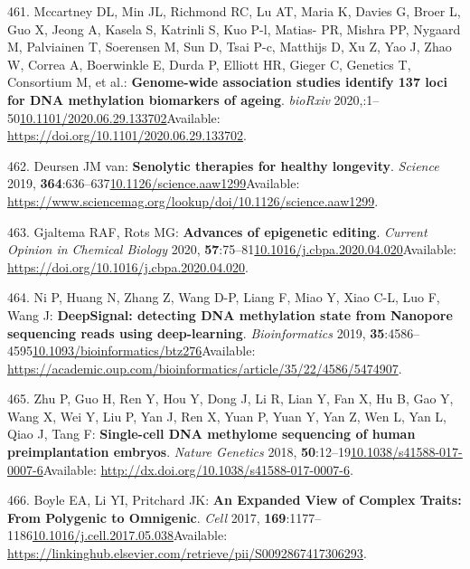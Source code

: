 \documentclass[
]{book}
\begin{document}
\leavevmode\hypertarget{ref-Mccartney2020}{}%
461. Mccartney DL, Min JL, Richmond RC, Lu AT, Maria K, Davies G, Broer L, Guo X, Jeong A, Kasela S, Katrinli S, Kuo P-l, Matias- PR, Mishra PP, Nygaard M, Palviainen T, Soerensen M, Sun D, Tsai P-c, Matthijs D, Xu Z, Yao J, Zhao W, Correa A, Boerwinkle E, Durda P, Elliott HR, Gieger C, Genetics T, Consortium M, et al.: \textbf{Genome-wide association studies identify 137 loci for DNA methylation biomarkers of ageing}. \emph{bioRxiv} 2020,:1--50\href{https://doi.org/10.1101/2020.06.29.133702}{10.1101/2020.06.29.133702}Available: \url{https://doi.org/10.1101/2020.06.29.133702}.

\leavevmode\hypertarget{ref-VanDeursen2019}{}%
462. Deursen JM van: \textbf{Senolytic therapies for healthy longevity}. \emph{Science} 2019, \textbf{364}:636--637\href{https://doi.org/10.1126/science.aaw1299}{10.1126/science.aaw1299}Available: \url{https://www.sciencemag.org/lookup/doi/10.1126/science.aaw1299}.

\leavevmode\hypertarget{ref-Gjaltema2020}{}%
463. Gjaltema RAF, Rots MG: \textbf{Advances of epigenetic editing}. \emph{Current Opinion in Chemical Biology} 2020, \textbf{57}:75--81\href{https://doi.org/10.1016/j.cbpa.2020.04.020}{10.1016/j.cbpa.2020.04.020}Available: \url{https://doi.org/10.1016/j.cbpa.2020.04.020}.

\leavevmode\hypertarget{ref-Ni2019}{}%
464. Ni P, Huang N, Zhang Z, Wang D-P, Liang F, Miao Y, Xiao C-L, Luo F, Wang J: \textbf{DeepSignal: detecting DNA methylation state from Nanopore sequencing reads using deep-learning}. \emph{Bioinformatics} 2019, \textbf{35}:4586--4595\href{https://doi.org/10.1093/bioinformatics/btz276}{10.1093/bioinformatics/btz276}Available: \url{https://academic.oup.com/bioinformatics/article/35/22/4586/5474907}.

\leavevmode\hypertarget{ref-Zhu2018a}{}%
465. Zhu P, Guo H, Ren Y, Hou Y, Dong J, Li R, Lian Y, Fan X, Hu B, Gao Y, Wang X, Wei Y, Liu P, Yan J, Ren X, Yuan P, Yuan Y, Yan Z, Wen L, Yan L, Qiao J, Tang F: \textbf{Single-cell DNA methylome sequencing of human preimplantation embryos}. \emph{Nature Genetics} 2018, \textbf{50}:12--19\href{https://doi.org/10.1038/s41588-017-0007-6}{10.1038/s41588-017-0007-6}Available: \url{http://dx.doi.org/10.1038/s41588-017-0007-6}.

\leavevmode\hypertarget{ref-Boyle2017}{}%
466. Boyle EA, Li YI, Pritchard JK: \textbf{An Expanded View of Complex Traits: From Polygenic to Omnigenic}. \emph{Cell} 2017, \textbf{169}:1177--1186\href{https://doi.org/10.1016/j.cell.2017.05.038}{10.1016/j.cell.2017.05.038}Available: \url{https://linkinghub.elsevier.com/retrieve/pii/S0092867417306293}.
\end{document}
